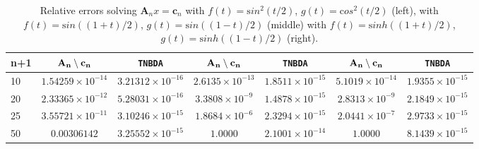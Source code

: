 

\begin{table}[ht]\centering
 \begin{tabular}{|l|cc|cc|cc|}
 \hline
 \bf{n+1} &   $\bf A_n\setminus {\mathbf c}_n$   & \bf \verb"TNBDA" &  $\bf A_n\setminus {\mathbf c}_n$   & \bf \verb"TNBDA"  &  $\bf A_n\setminus {\mathbf c}_n$   & \bf \verb"TNBDA"\\
 \hline
  10   & $1.54259 \times 10^{-14}$  & $3.21312 \times 10^{-16}$  &   $2.6135\times 10^{-13}$    &    $1.8511\times 10^{-15}$  &   $ 5.1019\times 10^{-14}$    &    $1.9355\times 10^{-15} $\\  
 20 & $2.33365\times10^{-12}$  & $5.28031\times 10^{-16}$  &  $3.3808 \times 10^{-9}$  &    $1.4878\times  10^{-15} $     &  $ 2.8313 \times 10^{-9}$  &    $2.1849 \times  10^{-15} $     \\   
25  & $3.55721 \times 10^{-11}$    &  $3.10246 \times 10^{-15}$  &  $1.8684\times 10^{-6} $   &  $2.3294 \times 10^{-15} $    &  $ 2.0441\times 10^{-7} $   &  $ 2.9733\times 10^{-15} $    \\ 
50  &   $0.00306142$  &   $3.25552 \times 10^{-15}$   &   $1.0000$    &   $2.1001\times  10^{-14}$    &   $1.0000$    &   $  8.1439\times  10^{-15}$  \\ \hline
   \end{tabular}
 \caption{\label{TableLinearSystemfg} Relative errors solving $ {\mathbf A}_nx={\mathbf c}_n$ with  $f(t)= \mathrm sin ^2\left( t/2  \right)$, $g(t) =  \mathrm cos^2 \left( t/2  \right)$ (left), with   $f(t)=\mathrm sin\left( (1+ t)/2\right)$, $g(t)=\mathrm sin\left( (1- t)/2\right)$ (middle)   with  $f(t)=\mathrm sinh\left( (1+ t)/2\right)$, $g(t)=\mathrm sinh\left( (1- t)/2\right)$ (right). }
 \end{table}
 